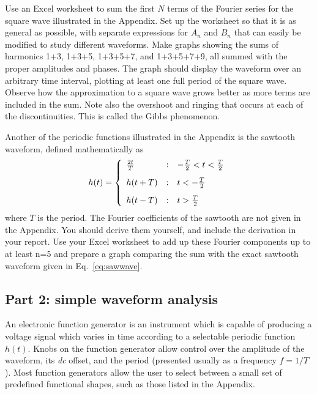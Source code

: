 \documentclass{revtex4}
\begin{document}
Use an Excel worksheet to sum the first $N$ terms of the Fourier series
for the square wave illustrated in the Appendix. Set up the worksheet so that
it is as general as possible, with separate expressions for $A_n$ and $B_n$
that can easily be modified to study different waveforms.  Make graphs
showing the sums of harmonics 1+3, 1+3+5, 1+3+5+7, and 1+3+5+7+9, all
summed with the proper amplitudes and phases. The graph should display
the waveform over an arbitrary time interval, plotting at least one full
period of the square wave.  Observe how the approximation to a square wave
grows better as more terms are included in the sum.  Note also the overshoot
and ringing that occurs at each of the discontinuities.
This is called the Gibbs phenomenon\cite{Thompson92}.

Another of the periodic functions illustrated in the Appendix is the sawtooth
waveform, defined mathematically as
\begin{equation}
h(t) = \left\{\begin{array}{lcl}
\frac{2t}{T} &:& -\frac{T}{2}<t<\frac{T}{2} \vspace{3mm} \\
h(t+T) &:& t<-\frac{T}{2} \vspace{3mm} \\
h(t-T) &:& t>\frac{T}{2}
\end{array}
\right.
\label{eq:sawwave}
\end{equation}
where $T$ is the period.  The Fourier coefficients of the sawtooth are not
given in the Appendix.  You should derive them yourself, and include the
derivation in your report.  Use your Excel worksheet to add up these Fourier
components up to at least n=5 and prepare a graph comparing the sum with the
exact sawtooth waveform given in Eq.~\ref{eq:sawwave}.

\subsection{Part 2: simple waveform analysis}

An electronic function generator is an instrument which is capable of
producing a voltage signal which varies in time according to a selectable
periodic function $h(t)$.  Knobs on the function generator allow control
over the amplitude of the waveform, its {\em dc} offset, and the period
(presented usually as a frequency $f=1/T$).
Most function generators allow the user to select between a small set of
predefined functional shapes, such as those listed in the Appendix.
\end{document}
